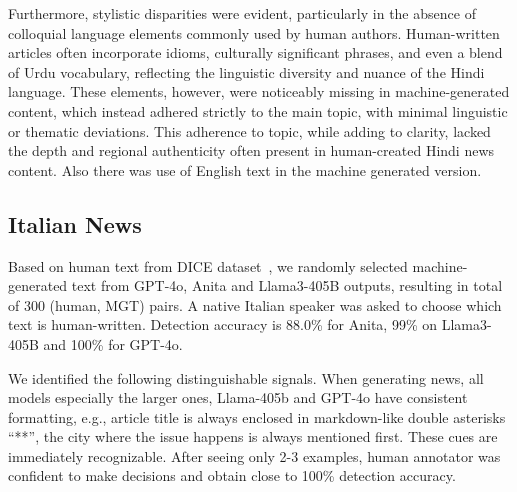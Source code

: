 Furthermore, stylistic disparities were evident, particularly in the absence of colloquial language elements commonly used by human authors. Human-written articles often incorporate idioms, culturally significant phrases, and even a blend of Urdu vocabulary, reflecting the linguistic diversity and nuance of the Hindi language. These elements, however, were noticeably missing in machine-generated content, which instead adhered strictly to the main topic, with minimal linguistic or thematic deviations. This adherence to topic, while adding to clarity, lacked the depth and regional authenticity often present in human-created Hindi news content. Also there was use of English text in the machine generated version.


\subsection{Italian News}
Based on human text from DICE dataset~\citep{bonisoli2023}, we randomly selected machine-generated text from GPT-4o, Anita \citep{polignano2024advanced} and Llama3-405B \citep{llama3} outputs, resulting in total of 300 (human, MGT) pairs.
A native Italian speaker was asked to choose which text is human-written. Detection accuracy is 88.0\% for Anita, 99\% on Llama3-405B and 100\% for GPT-4o.


We identified the following distinguishable signals. 
When generating news, all models especially the larger ones, Llama-405b and GPT-4o have consistent formatting, e.g., article title is always enclosed in markdown-like double asterisks ``**'', the city where the issue happens is always mentioned first. These cues are immediately recognizable. After seeing only 2-3 examples, human annotator was confident to make decisions and obtain close to 100\% detection accuracy.




